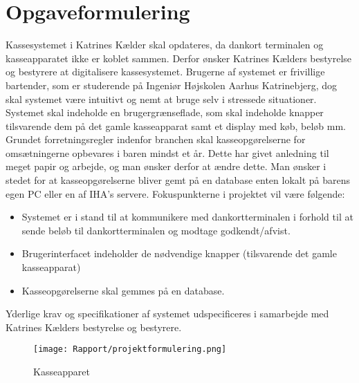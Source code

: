 \chapter{Opgaveformulering}
Kassesystemet i Katrines Kælder skal opdateres, da dankort terminalen og kasseapparatet ikke er koblet sammen. Derfor ønsker Katrines Kælders bestyrelse og bestyrere at digitalisere kassesystemet.
\newline\newline
Brugerne af systemet er frivillige bartender, som er studerende på Ingeniør Højskolen Aarhus Katrinebjerg, dog skal systemet være intuitivt og nemt at bruge selv i stressede situationer.
\newline\newline
Systemet skal indeholde en brugergrænseflade, som skal indeholde knapper tilsvarende dem på det gamle kasseapparat samt et display med køb, beløb mm. 
\newline\newline
Grundet forretningsregler indenfor branchen skal kasseopgørelserne for omsætningerne opbevares i baren mindst et år. Dette har givet anledning til meget papir og arbejde, og man ønsker derfor at ændre dette. Man ønsker i stedet for at kasseopgørelserne bliver gemt på en database enten lokalt på barens egen PC
eller en af IHA’s servere.
\newline\newline
Fokuspunkterne i projektet vil være følgende:
\begin{itemize}
\item Systemet er i stand til at kommunikere med dankortterminalen i forhold til at sende beløb til
dankortterminalen og modtage godkendt/afvist.
\item Brugerinterfacet indeholder de nødvendige knapper (tilsvarende det gamle kasseapparat)
\item Kasseopgørelserne skal gemmes på en database.
\newline
\end{itemize}
Yderlige krav og specifikationer af systemet udspecificeres i samarbejde med Katrines Kælders bestyrelse
og bestyrere.

\begin{figure}[h]
    \centering
    \texttt{[image: Rapport/projektformulering.png]}
    \caption{Kasseapparet}
    \label{fig:kasseapparat}
\end{figure}